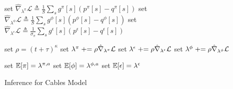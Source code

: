 \begin{algorithm}
{	set $\hat\nabla_{\lambda^{\pi}} \mathcal{L} \triangleq \frac{1}{S} \sum_s g^\pi[s] ( p^\pi[s] -  q^\pi[s] )$ \;
	set $\hat\nabla_{\lambda^{\phi} }\mathcal{L} \triangleq \frac{1}{S} \sum_s g^\phi[s] ( p^\phi[s] -  q^\phi[s] )$ \;
	set $\hat\nabla_{\lambda^{\epsilon}} \mathcal{L} \triangleq \frac{1}{\sigma_\pi} \sum_s g^\epsilon[s] ( p^\epsilon[s] -  q^\epsilon[s] )$ \;

	\BlankLine
	set $\rho= (t +\tau)^\kappa$ \;
	set $\lambda^{\pi} \mathrel{+}= \rho \hat\nabla_{\lambda^{\pi}} \mathcal{L}$ \;
	set $\lambda^{\epsilon} \mathrel{+}= \rho \hat\nabla_{\lambda^{\epsilon}} \mathcal{L}$ \;
	set $\lambda^{\phi} \mathrel{+}= \rho \hat\nabla_{\lambda^{\phi}} \mathcal{L}$ \;
}

set $\mathbb{E}[\pi] = \lambda^{\pi,a}$ \;
set $\mathbb{E}[\phi] = \lambda^{\phi,a}$ \;
set $\mathbb{E}[\epsilon] = \lambda^{\epsilon}$ \;
\BlankLine
\Return{$\E[\pi]$, $\E[\phi]$, $\E[\epsilon]$} \;
\caption{Inference for Cables Model}
\label{alg:cables}
\end{algorithm}




